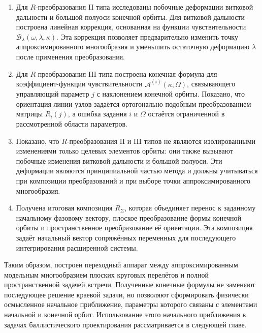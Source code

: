 \begin{enumerate}
	\item Для \(R\)-преобразования II типа исследованы побочные деформации витковой дальности и большой полуоси конечной орбиты. Для витковой дальности построена линейная коррекция, основанная на функции чувствительности \(\mathcal B_\lambda(\omega,\lambda,\kappa)\). Эта коррекция позволяет предварительно изменить точку аппроксимированного многообразия и уменьшить остаточную деформацию \(\lambda\) после применения преобразования.
	
	\item Для \(R\)-преобразования III типа построена конечная формула для коэффициент-функции чувствительности \(\mathcal A^{(i)}(\kappa,\Omega)\), связывающего управляющий параметр \(j\) с наклонением конечной орбиты. Показано, что ориентация линии узлов задаётся ортогонально подобным преобразованием матрицы \(R_i(j)\), а ошибка задания \(i\) и \(\Omega\) остаётся ограниченной в рассмотренной области параметров.
	
	\item Показано, что \(R\)-преобразования II и III типов не являются изолированными изменениями только целевых элементов орбиты: они также вызывают побочные изменения витковой дальности и большой полуоси. Эти деформации являются принципиальной частью метода и должны учитываться при композиции преобразований и при выборе точки аппроксимированного многообразия.
	
	\item Получена итоговая композиция \(R_\Sigma\), которая объединяет перенос к заданному начальному фазовому вектору, плоское преобразование формы конечной орбиты и пространственное преобразование её ориентации. Эта композиция задаёт начальный вектор сопряжённых переменных для последующего интегрирования расширенной системы.
\end{enumerate}

Таким образом, построен переходный аппарат между аппроксимированным модельным многообразием плоских круговых перелётов и полной пространственной задачей встречи. Полученные конечные формулы не заменяют последующее решение краевой задачи, но позволяют сформировать физически осмысленное начальное приближение, параметры которого связаны с элементами начальной и конечной орбит. Использование этого начального приближения в задачах баллистического проектирования рассматривается в следующей главе.
